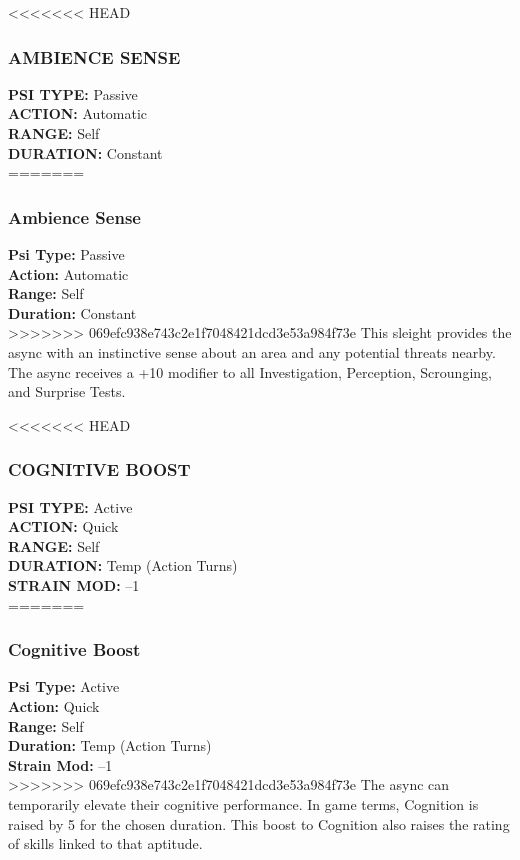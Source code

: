 <<<<<<< HEAD \subsubsection{AMBIENCE SENSE} \textbf{PSI TYPE:} Passive \\ \textbf{ACTION:} Automatic \\ \textbf{RANGE:} Self \\ \textbf{DURATION:} Constant \\ ======= \subsubsection{Ambience Sense} \textbf{Psi Type:} Passive \\ \textbf{Action:} Automatic \\ \textbf{Range:} Self \\ \textbf{Duration:} Constant \\ >>>>>>> 069efc938e743c2e1f7048421dcd3e53a984f73e This sleight provides the async with an instinctive sense about an area and any potential threats nearby. The async receives a +10 modifier to all Investigation, Perception, Scrounging, and Surprise Tests. 

<<<<<<< HEAD \subsubsection{COGNITIVE BOOST} \textbf{PSI TYPE:} Active \\ \textbf{ACTION:} Quick \\ \textbf{RANGE:} Self \\ \textbf{DURATION:} Temp (Action Turns) \\ \textbf{STRAIN MOD:} –1 \\ ======= \subsubsection{Cognitive Boost} \textbf{Psi Type:} Active \\ \textbf{Action:} Quick \\ \textbf{Range:} Self \\ \textbf{Duration:} Temp (Action Turns) \\ \textbf{Strain Mod:} –1 \\ >>>>>>> 069efc938e743c2e1f7048421dcd3e53a984f73e The async can temporarily elevate their cognitive performance. In game terms, Cognition is raised by 5 for the chosen duration. This boost to Cognition also raises the rating of skills linked to that aptitude. 

